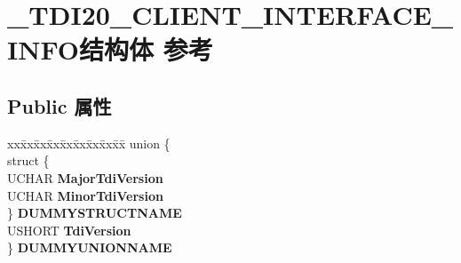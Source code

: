 \hypertarget{struct___t_d_i20___c_l_i_e_n_t___i_n_t_e_r_f_a_c_e___i_n_f_o}{}\section{\+\_\+\+T\+D\+I20\+\_\+\+C\+L\+I\+E\+N\+T\+\_\+\+I\+N\+T\+E\+R\+F\+A\+C\+E\+\_\+\+I\+N\+F\+O结构体 参考}
\label{struct___t_d_i20___c_l_i_e_n_t___i_n_t_e_r_f_a_c_e___i_n_f_o}
\subsection*{Public 属性}
\begin{DoxyCompactItemize}
\item 
\mbox{\label{struct___t_d_i20___c_l_i_e_n_t___i_n_t_e_r_f_a_c_e___i_n_f_o_a63cbd90bcffdd5de769f7d08a5c20b56}} 
\begin{tabbing}
xx\=xx\=xx\=xx\=xx\=xx\=xx\=xx\=xx\=\kill
union \{\\
\>struct \{\\
\>\>UCHAR {\bfseries MajorTdiVersion}\\
\>\>UCHAR {\bfseries MinorTdiVersion}\\
\>\} {\bfseries DUMMYSTRUCTNAME}\\
\>USHORT {\bfseries TdiVersion}\\
\} {\bfseries DUMMYUNIONNAME}\\


\end{tabbing}
\end{DoxyCompactItemize}
